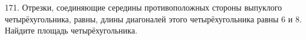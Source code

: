 171. Отрезки, соединяющие середины противоположных стороны выпуклого четырёхугольника, равны, длины диагоналей этого четырёхугольника равны 6 и 8. Найдите площадь четырёхугольника.\\
